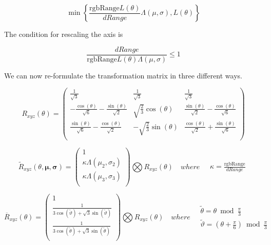 \begin{equation}\label{eq:RescaleAxis}
\min\left\{ \frac{\text{rgbRange} L(\theta)}{dRange} \Lambda(\mu,\sigma) , L(\theta) \right\}
\end{equation}

The condition for rescaling the axis is

\begin{equation}\label{eq:RescaleAxisCondition}
\frac{dRange}{\text{rgbRange} L(\theta) \Lambda(\mu,\sigma)} \le 1
\end{equation}

We can now re-formulate the transformation matrix in three different ways.

\begin{equation}\label{eq:Rotation}
 R_{xyz}(\theta) = \left(
\begin{array}{ccc}
 \frac{1}{\sqrt{3}} & \frac{1}{\sqrt{3}} & \frac{1}{\sqrt{3}} \\
 -\frac{\cos (\theta )}{\sqrt{6}}-\frac{\sin (\theta )}{\sqrt{2}} &
 \sqrt{\frac{2}{3}} \cos (\theta ) &
 \frac{\sin (\theta )}{\sqrt{2}}-\frac{\cos (\theta )}{\sqrt{6}} \\
 \frac{\sin (\theta )}{\sqrt{6}}-\frac{\cos (\theta )}{\sqrt{2}} &
 -\sqrt{\frac{2}{3}} \sin (\theta ) &
 \frac{\cos (\theta )}{\sqrt{2}}+\frac{\sin (\theta )}{\sqrt{6}} \\
\end{array}
\right)
\end{equation}

\begin{equation}\label{eq:CompressedRotation}
 \widetilde{R}_{xyz}(\theta,\mathbf{\mu},\mathbf{\sigma}) =
\left(
\begin{array}{c}
 1  \\
 \kappa \Lambda(\mu_2,\sigma_2) \\
 \kappa \Lambda(\mu_3,\sigma_3) \\
\end{array}
\right)
\bigotimes
R_{xyz}(\theta) \quad where \quad
\begin{array}{c}
\kappa = \frac{\text{rgbRange} }{dRange}
\end{array}
\end{equation}

\begin{equation}\label{eq:NormRxyz2}
 \overline{R}_{xyz}(\theta) =
\left(
\begin{array}{c}
 1  \\
 \frac{1}{3 \cos \left(\widetilde{\vartheta}\right)+\sqrt{3} \sin \left(\widetilde{\vartheta}\right)} \\
 \frac{1}{3 \cos \left(\widetilde{\theta}\right)+\sqrt{3} \sin \left(\widetilde{\theta}\right)}  \\
\end{array}
\right)
\bigotimes
R_{xyz}(\theta) \quad where \quad 
\begin{array}{c}
\widetilde{\theta} = \theta  \bmod \frac{\pi }{3} \\
\widetilde{\vartheta} = \left(\theta +\frac{\pi }{6}\right) \bmod \frac{\pi }{3}
\end{array}
\end{equation}


